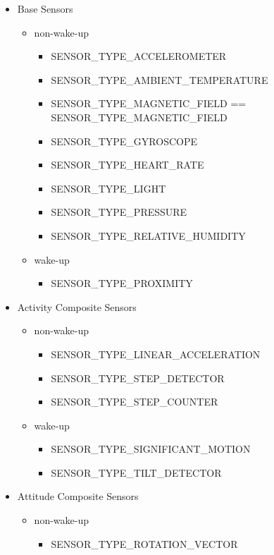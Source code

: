 \documentclass{article}
\begin{document}
\begin{itemize}
  \item Base Sensors
    \begin{itemize}
    \item non-wake-up
      \begin{itemize}
        \item SENSOR\_TYPE\_ACCELEROMETER
        \item SENSOR\_TYPE\_AMBIENT\_TEMPERATURE
        \item SENSOR\_TYPE\_MAGNETIC\_FIELD == SENSOR\_TYPE\_MAGNETIC\_FIELD
        \item SENSOR\_TYPE\_GYROSCOPE
        \item SENSOR\_TYPE\_HEART\_RATE
        \item SENSOR\_TYPE\_LIGHT
        \item SENSOR\_TYPE\_PRESSURE
        \item SENSOR\_TYPE\_RELATIVE\_HUMIDITY
      \end{itemize}
    \item wake-up
      \begin{itemize}
        \item SENSOR\_TYPE\_PROXIMITY
      \end{itemize}
    \end{itemize}
  \item Activity Composite Sensors
    \begin{itemize}
    \item non-wake-up
      \begin{itemize}
      \item SENSOR\_TYPE\_LINEAR\_ACCELERATION
      \item SENSOR\_TYPE\_STEP\_DETECTOR
      \item SENSOR\_TYPE\_STEP\_COUNTER
      \end{itemize}
    \item wake-up
      \begin{itemize}
      \item SENSOR\_TYPE\_SIGNIFICANT\_MOTION
      \item SENSOR\_TYPE\_TILT\_DETECTOR
      \end{itemize}
    \end{itemize}
  \item Attitude Composite Sensors
    \begin{itemize}
    \item non-wake-up
      \begin{itemize}
      \item SENSOR\_TYPE\_ROTATION\_VECTOR

\end{itemize}
\end{itemize}
\end{itemize}
\end{document}
